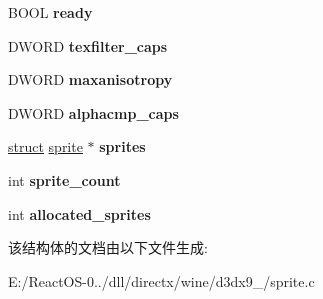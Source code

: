 \begin{DoxyCompactItemize}
B\+O\+OL {\bfseries ready}
\item 
\mbox{\label{structd3dx9__sprite_a16b8d1e62303003c055c717185ca8c8e}} 
D\+W\+O\+RD {\bfseries texfilter\+\_\+caps}
\item 
\mbox{\label{structd3dx9__sprite_a56fc2830c82df067c55abdfdf20ddbc2}} 
D\+W\+O\+RD {\bfseries maxanisotropy}
\item 
\mbox{\label{structd3dx9__sprite_afc701c7873d65d0906a83845c5ec6ab9}} 
D\+W\+O\+RD {\bfseries alphacmp\+\_\+caps}
\item 
\mbox{\label{structd3dx9__sprite_a5549106f4963aa2f2289d9eda0e73867}} 
\hyperlink{interfacestruct}{struct} \hyperlink{structsprite}{sprite} $\ast$ {\bfseries sprites}
\item 
\mbox{\label{structd3dx9__sprite_af3b3e540a7da85cfac58cbce099755ac}} 
int {\bfseries sprite\+\_\+count}
\item 
\mbox{\label{structd3dx9__sprite_ae94cce1f9faa1e41b7f159dae7960c56}} 
int {\bfseries allocated\+\_\+sprites}
\end{DoxyCompactItemize}


该结构体的文档由以下文件生成\+:\begin{DoxyCompactItemize}
\item 
E\+:/\+React\+O\+S-\/0../dll/directx/wine/d3dx9\+\_/sprite.\+c\end{DoxyCompactItemize}
